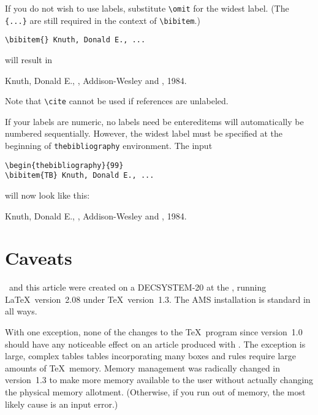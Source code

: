 If you do not wish to use labels, substitute \verb"\omit" for the widest
label.  (The \verb"{...}" are still required in the context of
\verb"\bibitem".)
\begin{verbatim}
\bibitem{} Knuth, Donald E., ...
\end{verbatim}
will result in
\par\nobreak\smallskip
{\begin{pseudobibliography}{\omit}
\bibitem{} Knuth, Donald E., \TB, Addison-Wesley and \AMS, 1984.\endgraf
\end{pseudobibliography}
}
\smallskip
\noindent Note that \verb"\cite" cannot be used if references are unlabeled.

If your labels are numeric, no labels need be entered\Dash items will
automatically be numbered sequentially.  However, the widest label
must be specified at the beginning of \verb"thebibliography" environment.
The input
\begin{verbatim}
\begin{thebibliography}{99}
\bibitem{TB} Knuth, Donald E., ...
\end{verbatim}
will now look like this:
\par\nobreak\smallskip
{\begin{pseudobibliography}{99}
 Knuth, Donald E., \TB, Addison-Wesley and \AMS, 1984.\endgraf
\end{pseudobibliography}
}











\section{Caveats}

\DP\ and this article were created on a DECSYSTEM-20 at the
\AMS, running \LaTeX\ version~2.08 under
\TeX\ version~1.3.  The AMS installation is standard in all ways.

With one exception, none of the changes to the \TeX\ program since
version~1.0 should have any noticeable effect on an article produced
with \DP.  The exception is large, complex tables\Dash
tables incorporating many boxes and rules require large amounts of
\TeX\ memory.  Memory management was radically changed in version~1.3
to make more memory available to the user without actually changing
the physical memory allotment.  (Otherwise, if you run out of memory,
the most likely cause is an input error.)

